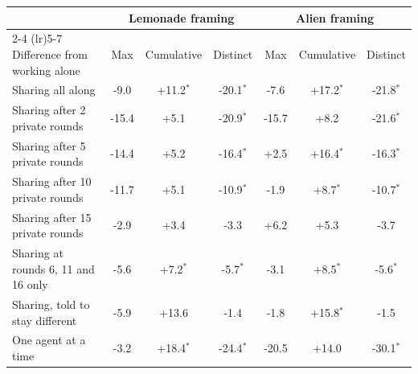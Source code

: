 \begin{tabular}{l ccc ccc}
\toprule
 & \multicolumn{3}{c}{Lemonade framing} & \multicolumn{3}{c}{Alien framing} \\
\cmidrule(lr){2-4} \cmidrule(lr){5-7}
Difference from working alone & Max & Cumulative & Distinct & Max & Cumulative & Distinct \\
\midrule
Sharing all along & -9.0 & +11.2$^{\ast}$ & -20.1$^{\ast}$ & -7.6 & +17.2$^{\ast}$ & -21.8$^{\ast}$ \\
Sharing after 2 private rounds & -15.4 & +5.1 & -20.9$^{\ast}$ & -15.7 & +8.2 & -21.6$^{\ast}$ \\
Sharing after 5 private rounds & -14.4 & +5.2 & -16.4$^{\ast}$ & +2.5 & +16.4$^{\ast}$ & -16.3$^{\ast}$ \\
Sharing after 10 private rounds & -11.7 & +5.1 & -10.9$^{\ast}$ & -1.9 & +8.7$^{\ast}$ & -10.7$^{\ast}$ \\
Sharing after 15 private rounds & -2.9 & +3.4 & -3.3 & +6.2 & +5.3 & -3.7 \\
Sharing at rounds 6, 11 and 16 only & -5.6 & +7.2$^{\ast}$ & -5.7$^{\ast}$ & -3.1 & +8.5$^{\ast}$ & -5.6$^{\ast}$ \\
Sharing, told to stay different & -5.9 & +13.6 & -1.4 & -1.8 & +15.8$^{\ast}$ & -1.5 \\
One agent at a time & -3.2 & +18.4$^{\ast}$ & -24.4$^{\ast}$ & -20.5 & +14.0 & -30.1$^{\ast}$ \\
\bottomrule
\end{tabular}